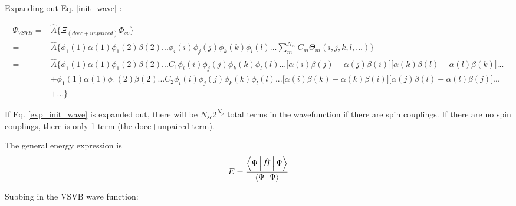 \documentclass[a4paper]{article}
\begin{document}
Expanding out Eq. \ref{init_wave} :
      
 \begin{equation}
 \begin{aligned}
 \Psi_{VSVB} = &\hat{A} \{ \Xi_{(docc+unpaired)}\Phi_{sc} \} \\
 = &\hat{A} \{\phi_1(1)\alpha(1)\phi_1(2) \beta(2)... \phi_i(i) \phi_j(j) \phi_k(k) \phi_l(l)...\sum_m^{N_{sc}} C_m \Theta_m(i,j,k,l,...)  \} \\
 =& \hat{A} \{ \phi_1(1)\alpha(1)\phi_1(2) \beta(2)... C_1 \phi_i(i) \phi_j(j) \phi_k(k) \phi_l(l)...  \big[\alpha(i)\beta(j)-\alpha(j)\beta(i)\big]\big[\alpha(k)\beta(l)-\alpha(l)\beta(k)\big]... \\ &
 + \phi_1(1)\alpha(1)\phi_1(2) \beta(2)... C_2\phi_i(i) \phi_j(j) \phi_k(k) \phi_l(l)...  \big[\alpha(i)\beta(k)-\alpha(k)\beta(i)\big] \big[\alpha(j)\beta(l)-\alpha(l)\beta(j)\big]... \\ &+  ... \} 
 \label{exp_init_wave}
 \end{aligned}
 \end{equation}
 
 If Eq. \ref{exp_init_wave} is expanded out, there will be $N_{sc}2^{N_p}$ total terms in the wavefunction if there are spin couplings. If there are no spin couplings, there is only 1 term (the docc+unpaired term).



The general energy expression is \[E = \frac{\Braket{\Psi|\hat{H}|\Psi}}{\Braket{\Psi|\Psi}} \]


Subbing in the VSVB wave function:
\end{document}
